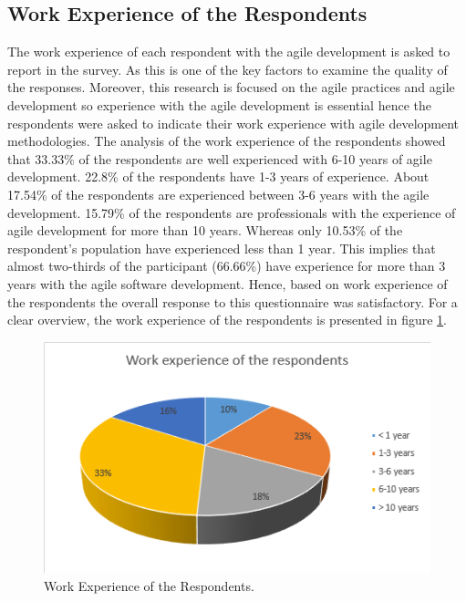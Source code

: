 \documentclass[a4paper,oneside]{bth}
\begin{document}
\subsection{Work Experience of the Respondents}
The work experience of each respondent with the agile development is asked to report in the survey. As this is one of the key factors to examine the quality of the responses. Moreover, this research is focused on the agile practices and agile development so experience with the agile development is essential hence the respondents were asked to indicate their work experience with agile development methodologies. The analysis of the work experience of the respondents showed that 33.33\% of the respondents are well experienced with 6-10 years of agile development. 22.8\% of the respondents have 1-3 years of experience. About 17.54\% of the respondents are experienced between 3-6 years with the agile development. 15.79\% of the respondents are professionals with the experience of agile development for more than 10 years. Whereas only 10.53\% of the respondent’s population have experienced less than 1 year. This implies that almost two-thirds of the participant (66.66\%) have experience for more than 3 years with the agile software development. Hence, based on work experience of the respondents the overall response to this questionnaire was satisfactory. For a clear overview, the work experience of the respondents is presented in figure \ref{work experience}.
\begin{figure}[h]
\centering
\includegraphics[]{Work experience.png}
\caption{Work Experience of the Respondents. \label{work experience}}
\end{figure}
\end{document}
